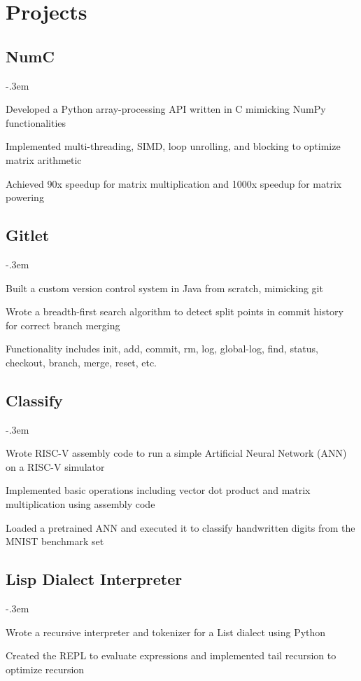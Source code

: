 \documentclass{article}
\let\olditemize=\itemize \let\endolditemize=\enditemize
\renewenvironment{itemize}{\olditemize[topsep=0em] \itemsep-.3em}{\endolditemize}
\begin{document}
\section{Projects}

\subsection{NumC}
\begin{itemize}
  \item Developed a Python array-processing API written in C mimicking NumPy functionalities
  \item Implemented multi-threading, SIMD, loop unrolling, and blocking to optimize matrix arithmetic
  \item Achieved 90x speedup for matrix multiplication and 1000x speedup for matrix powering
\end{itemize}

\subsection{Gitlet}
\begin{itemize}
  \item Built a custom version control system in Java from scratch, mimicking git
  \item Wrote a breadth-first search algorithm to detect split points in commit history for correct branch merging
  \item Functionality includes init, add, commit, rm, log, global-log, find, status, checkout, branch, merge, reset, etc.
\end{itemize}

\subsection{Classify}
\begin{itemize}
  \item Wrote RISC-V assembly code to run a simple Artificial Neural Network (ANN) on a RISC-V simulator
  \item Implemented basic operations including vector dot product and matrix multiplication using assembly code
  \item Loaded a pretrained ANN and executed it to classify handwritten digits from the MNIST benchmark set
\end{itemize}

\subsection{Lisp Dialect Interpreter}
\begin{itemize}
  \item Wrote a recursive interpreter and tokenizer for a List dialect using Python
  \item Created the REPL to evaluate expressions and implemented tail recursion to optimize recursion
\end{itemize}
\end{document}
